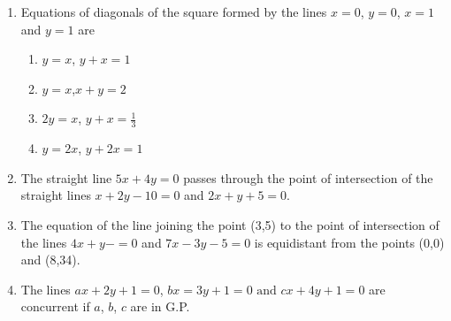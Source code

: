 \begin{enumerate}[label=\thesubsection.\arabic*,ref=\thesubsection.\theenumi]
\item Equations of diagonals of the square formed by the lines $x=0$, $y=0$, $x=1$ and $y=1$ are
\begin{enumerate}
\item $y=x$, $y+x=1$
\item $y=x$,$x+y=2$
\item $2y=x$, $y+x=\frac{1}{3}$
\item $y=2x$, $y+2x=1$
\end{enumerate}
\item The straight line $5x+4y=0$ passes through the point of intersection of the straight lines $x+2y-10=0$ and $2x+y+5=0$.
\item The equation of the line joining the point (3,5) to the point of intersection of the lines $4x+y-=0$ and $7x-3y-5=0$ is equidistant from the points (0,0) and (8,34).
\item The lines $ax+2y+1=0$, $bx=3y+1=0\text{ and }cx+4y+1=0$ are concurrent if $a$, $b$, $c$ are in G.P.
\end{enumerate}

